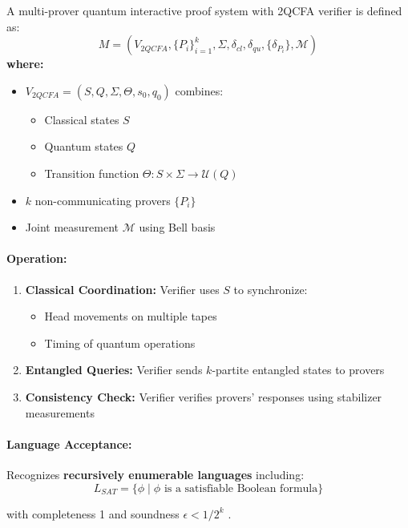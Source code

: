 \begin{definition}
A multi-prover quantum interactive proof system with 2QCFA verifier is defined as:
\[
M = (V_{2QCFA}, \{P_i\}_{i=1}^k, \Sigma, \delta_{cl}, \delta_{qu}, \{\delta_{P_i}\}, \mathcal{M})
\]
\textbf{where:}
\begin{itemize}
    \item $V_{2QCFA} = (S, Q, \Sigma, \Theta, s_0, q_0)$ combines:
    \begin{itemize}
        \item Classical states $S$
        \item Quantum states $Q$
        \item Transition function $\Theta: S \times \Sigma \rightarrow \mathcal{U}(Q)$
    \end{itemize}
    \item $k$ non-communicating provers $\{P_i\}$
    \item Joint measurement $\mathcal{M}$ using Bell basis
\end{itemize}
\end{definition}

\paragraph{Operation:}
\begin{enumerate}
    \item \textbf{Classical Coordination:} Verifier uses $S$ to synchronize:
    \begin{itemize}
        \item Head movements on multiple tapes
        \item Timing of quantum operations
    \end{itemize}
    \item \textbf{Entangled Queries:} Verifier sends $k$-partite entangled states to provers
    \item \textbf{Consistency Check:} Verifier verifies provers' responses using stabilizer measurements
\end{enumerate}

\paragraph{Language Acceptance:}
Recognizes \textbf{recursively enumerable languages} including:
\[
L_{SAT} = \{\phi \mid \phi \text{ is a satisfiable Boolean formula}\}
\]

with completeness 1 and soundness $\epsilon < 1/2^k$ \cite{kobayashi2003quantum}.


